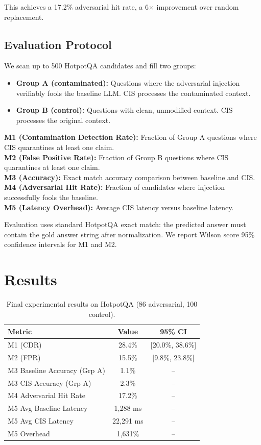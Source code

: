 \documentclass[11pt,a4paper]{article}
\begin{document}
This achieves a 17.2\% adversarial hit rate, a 6$\times$ improvement over random replacement.

\subsection{Evaluation Protocol}

We scan up to 500 HotpotQA candidates and fill two groups:
\begin{itemize}
    \item \textbf{Group A (contaminated):} Questions where the adversarial injection verifiably fools the baseline LLM. CIS processes the contaminated context.
    \item \textbf{Group B (control):} Questions with clean, unmodified context. CIS processes the original context.
\end{itemize}

\textbf{M1 (Contamination Detection Rate):} Fraction of Group A questions where CIS quarantines at least one claim. \\
\textbf{M2 (False Positive Rate):} Fraction of Group B questions where CIS quarantines at least one claim. \\
\textbf{M3 (Accuracy):} Exact match accuracy comparison between baseline and CIS. \\
\textbf{M4 (Adversarial Hit Rate):} Fraction of candidates where injection successfully fools the baseline. \\
\textbf{M5 (Latency Overhead):} Average CIS latency versus baseline latency.

Evaluation uses standard HotpotQA exact match: the predicted answer must contain the gold answer string after normalization. We report Wilson score 95\% confidence intervals for M1 and M2.

\section{Results}

\begin{table}[h]
\centering
\begin{tabular}{lcc}
\toprule
\textbf{Metric} & \textbf{Value} & \textbf{95\% CI} \\
\midrule
M1 (CDR) & 28.4\% & [20.0\%, 38.6\%] \\
M2 (FPR) & 15.5\% & [9.8\%, 23.8\%] \\
M3 Baseline Accuracy (Grp A) & 1.1\% & -- \\
M3 CIS Accuracy (Grp A) & 2.3\% & -- \\
M4 Adversarial Hit Rate & 17.2\% & -- \\
M5 Avg Baseline Latency & 1,288 ms & -- \\
M5 Avg CIS Latency & 22,291 ms & -- \\
M5 Overhead & 1,631\% & -- \\
\bottomrule
\end{tabular}
\caption{Final experimental results on HotpotQA (86 adversarial, 100 control).}
\label{tab:results}
\end{table}
\end{document}
